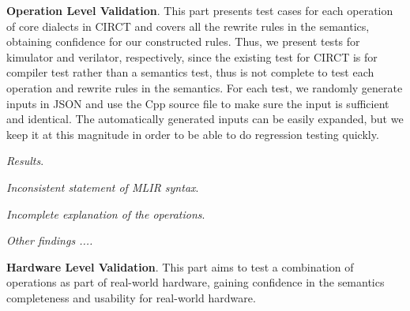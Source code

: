 
\smallskip
\textbf{Operation Level Validation}. This part presents test cases for each operation of core dialects in CIRCT and covers all the rewrite rules in the semantics, obtaining confidence for our constructed rules. Thus, we present  tests for kimulator and verilator, respectively, since the existing test for CIRCT is for compiler test rather than a semantics test, thus is not complete to test each operation and rewrite rules in the semantics. For each test, we randomly generate  inputs in JSON and use the Cpp source file to make sure the input is sufficient and identical. The automatically generated inputs can be easily expanded, but we keep it at this magnitude in order to be able to do regression testing quickly.  


\smallskip
\textit{Results}. 

\smallskip
\textit{Inconsistent statement of MLIR syntax}. 

\smallskip
\textit{Incomplete explanation of the operations}. 

\smallskip
\textit{Other findings ....}


\smallskip
\textbf{Hardware Level Validation}. This part aims to test a combination of operations as part of real-world hardware, gaining confidence in the semantics completeness and usability for real-world hardware.  

